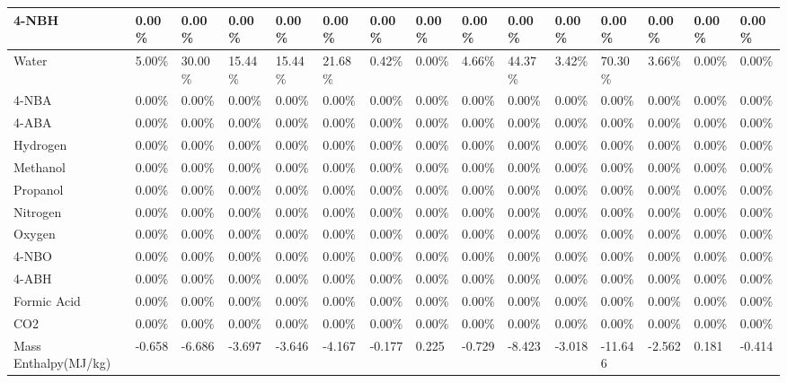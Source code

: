 \begin{landscape}
\begin{table}[H]
\begin{tabular}{|l|l|l|l|l|l|l|l|l|l|l|l|l|l|l|}
4-NBH                   & 0.00\%  & 0.00\%  & 0.00\%  & 0.00\%  & 0.00\%  & 0.00\%  & 0.00\%  & 0.00\%  & 0.00\%  & 0.00\%  & 0.00\%  & 0.00\%  & 0.00\%  & 0.00\%   \\ \hline
Water                   & 5.00\%  & 30.00\% & 15.44\% & 15.44\% & 21.68\% & 0.42\%  & 0.00\%  & 4.66\%  & 44.37\% & 3.42\%  & 70.30\% & 3.66\%  & 0.00\%  & 0.00\%   \\ \hline
4-NBA                   & 0.00\%  & 0.00\%  & 0.00\%  & 0.00\%  & 0.00\%  & 0.00\%  & 0.00\%  & 0.00\%  & 0.00\%  & 0.00\%  & 0.00\%  & 0.00\%  & 0.00\%  & 0.00\%   \\ \hline
4-ABA                   & 0.00\%  & 0.00\%  & 0.00\%  & 0.00\%  & 0.00\%  & 0.00\%  & 0.00\%  & 0.00\%  & 0.00\%  & 0.00\%  & 0.00\%  & 0.00\%  & 0.00\%  & 0.00\%   \\ \hline
Hydrogen                & 0.00\%  & 0.00\%  & 0.00\%  & 0.00\%  & 0.00\%  & 0.00\%  & 0.00\%  & 0.00\%  & 0.00\%  & 0.00\%  & 0.00\%  & 0.00\%  & 0.00\%  & 0.00\%   \\ \hline
Methanol                & 0.00\%  & 0.00\%  & 0.00\%  & 0.00\%  & 0.00\%  & 0.00\%  & 0.00\%  & 0.00\%  & 0.00\%  & 0.00\%  & 0.00\%  & 0.00\%  & 0.00\%  & 0.00\%   \\ \hline
Propanol                & 0.00\%  & 0.00\%  & 0.00\%  & 0.00\%  & 0.00\%  & 0.00\%  & 0.00\%  & 0.00\%  & 0.00\%  & 0.00\%  & 0.00\%  & 0.00\%  & 0.00\%  & 0.00\%   \\ \hline
Nitrogen                & 0.00\%  & 0.00\%  & 0.00\%  & 0.00\%  & 0.00\%  & 0.00\%  & 0.00\%  & 0.00\%  & 0.00\%  & 0.00\%  & 0.00\%  & 0.00\%  & 0.00\%  & 0.00\%   \\ \hline
Oxygen                  & 0.00\%  & 0.00\%  & 0.00\%  & 0.00\%  & 0.00\%  & 0.00\%  & 0.00\%  & 0.00\%  & 0.00\%  & 0.00\%  & 0.00\%  & 0.00\%  & 0.00\%  & 0.00\%   \\ \hline
4-NBO                   & 0.00\%  & 0.00\%  & 0.00\%  & 0.00\%  & 0.00\%  & 0.00\%  & 0.00\%  & 0.00\%  & 0.00\%  & 0.00\%  & 0.00\%  & 0.00\%  & 0.00\%  & 0.00\%   \\ \hline
4-ABH                   & 0.00\%  & 0.00\%  & 0.00\%  & 0.00\%  & 0.00\%  & 0.00\%  & 0.00\%  & 0.00\%  & 0.00\%  & 0.00\%  & 0.00\%  & 0.00\%  & 0.00\%  & 0.00\%   \\ \hline
Formic Acid             & 0.00\%  & 0.00\%  & 0.00\%  & 0.00\%  & 0.00\%  & 0.00\%  & 0.00\%  & 0.00\%  & 0.00\%  & 0.00\%  & 0.00\%  & 0.00\%  & 0.00\%  & 0.00\%   \\ \hline
CO2                     & 0.00\%  & 0.00\%  & 0.00\%  & 0.00\%  & 0.00\%  & 0.00\%  & 0.00\%  & 0.00\%  & 0.00\%  & 0.00\%  & 0.00\%  & 0.00\%  & 0.00\%  & 0.00\%   \\ \hline
Mass Enthalpy(MJ/kg)    & -0.658  & -6.686  & -3.697  & -3.646  & -4.167  & -0.177  & 0.225   & -0.729  & -8.423  & -3.018  & -11.646 & -2.562  & 0.181   & -0.414   \\ \hline
\end{tabular}
\end{table}




\end{landscape}
